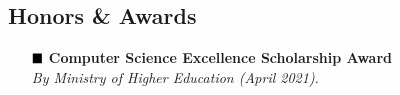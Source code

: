 \documentclass{article}
\begin{document}
\begin{titlepage}
		\section{Honors \& Awards}
		\begin{enumerate}[leftmargin=1.8cm]
				\scriptsize\selectfont \item[$\scriptsize \blacksquare$] \large\selectfont \textbf{Computer Science Excellence Scholarship Award } \\  \emph{By Ministry of Higher Education (April 2021).}
			\end{enumerate}
	\end{titlepage}
	\restoregeometry
\end{document}
